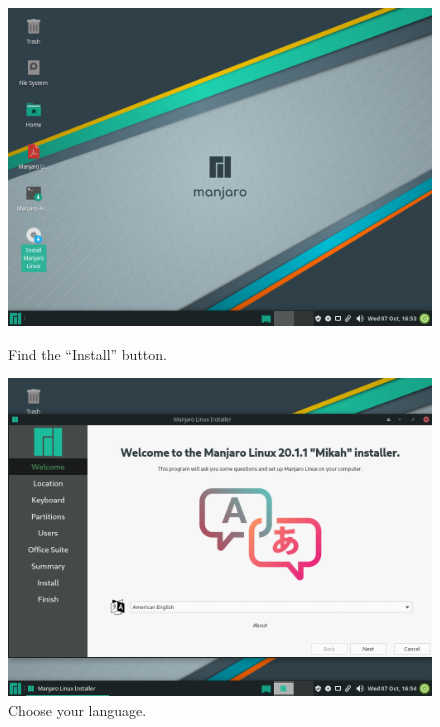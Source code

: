\documentclass{article}
\begin{document}
\begin{figure}[ht!]
    \centering
    \begin{minipage}{0.5\textwidth}
        \includegraphics[width=.95\linewidth]{images/Once_ready_to_install_linux_choose_the_install_manjaro_button_from_the_home_screen.png}
        \caption{Find the ``Install'' button.}
        \label{fig:installManjaroButton}
    \end{minipage}\hfill
    \centering
    \begin{minipage}{0.5\textwidth}
        \includegraphics[width=.95\linewidth]{images/Choose_the_language_you_want_it_can_be_almost_any_language_and_linux_is_extremely_diverse.png}
        \caption{Choose your language.}
        \label{fig:chooseLanguage}
    \end{minipage}\hfill

\end{figure}
\end{document}
